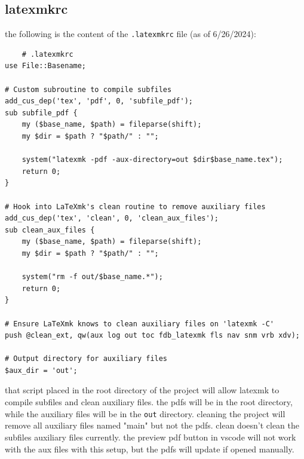 \documentclass[../../main.tex]{subfiles} %
\begin{document}
\subsection{latexmkrc}
the following is the content of the \texttt{.latexmkrc} file (as of 6/26/2024):
\begin{lstlisting}
    # .latexmkrc
use File::Basename;

# Custom subroutine to compile subfiles
add_cus_dep('tex', 'pdf', 0, 'subfile_pdf');
sub subfile_pdf {
    my ($base_name, $path) = fileparse(shift);
    my $dir = $path ? "$path/" : "";

    system("latexmk -pdf -aux-directory=out $dir$base_name.tex");
    return 0;
}

# Hook into LaTeXmk's clean routine to remove auxiliary files
add_cus_dep('tex', 'clean', 0, 'clean_aux_files');
sub clean_aux_files {
    my ($base_name, $path) = fileparse(shift);
    my $dir = $path ? "$path/" : "";

    system("rm -f out/$base_name.*");
    return 0;
}

# Ensure LaTeXmk knows to clean auxiliary files on 'latexmk -C'
push @clean_ext, qw(aux log out toc fdb_latexmk fls nav snm vrb xdv);

# Output directory for auxiliary files
$aux_dir = 'out';
\end{lstlisting}

that script placed in the root directory of the project will allow latexmk to compile subfiles and clean auxiliary files. the pdfs will be in the root directory, while the auxiliary files will be in the \texttt{out} directory. cleaning the project will remove all auxiliary files named "main" but not the pdfs. clean doesn't clean the subfiles auxiliary files currently. the preview pdf button in vscode will not work with the aux files with this setup, but the pdfs will update if opened manually. 
\end{document}

